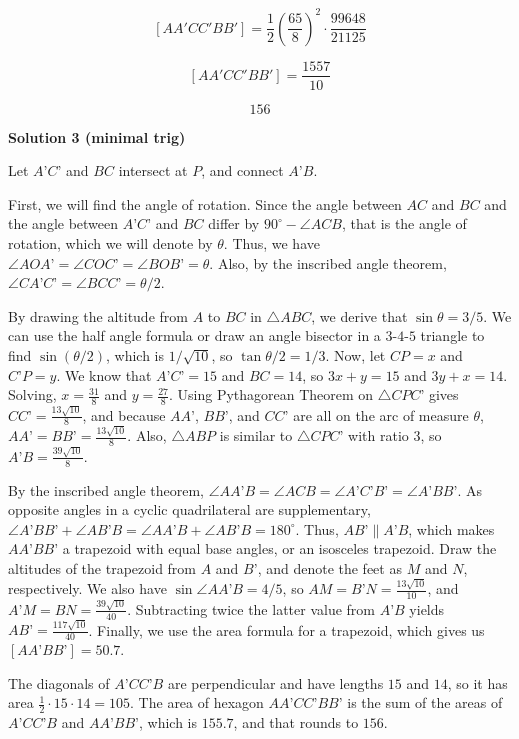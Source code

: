 \begin{enumerate}
 \[[AA'CC'BB'] =\frac12\left(\frac{65}{8}\right)^2\cdot\frac{99648}{21125}\]

 \[[AA'CC'BB']=\frac{1557}{10}\]

 \[\boxed{156}\]




\textbf{Solution 3 (minimal trig)}

Let $A’C’$ and $BC$ intersect at $P$, and connect $A’B$. 

 First, we will find the angle of rotation. Since the angle between $AC$ and $BC$ and the angle between $A’C’$ and $BC$ differ by $90^{\circ}-\angle ACB$, that is the angle of rotation, which we will denote by $\theta$. Thus, we have $\angle AOA’ = \angle COC’ = \angle BOB’ = \theta$. Also, by the inscribed angle theorem, $\angle CA’C’=\angle BCC’=\theta/2$. 

 By drawing the altitude from $A$ to $BC$ in $\triangle ABC$, we derive that $\sin{\theta}=3/5$. We can use the half angle formula or draw an angle bisector in a $3$-$4$-$5$ triangle to find $\sin({\theta/2})$, which is $1/\sqrt{10}$, so $\tan{\theta/2}=1/3$. Now, let $CP=x$ and $C’P=y$. We know that $A’C’=15$ and $BC=14$, so $3x+y=15$ and $3y+x=14$. Solving, $x=\frac{31}{8}$ and $y=\frac{27}{8}$. Using Pythagorean Theorem on $\triangle CPC’$ gives $CC’=\frac{13\sqrt{10}}{8}$, and because $AA’$, $BB’$, and $CC’$ are all on the arc of measure $\theta$, $AA’=BB’=\frac{13\sqrt{10}}{8}$. Also, $\triangle ABP$ is similar to $\triangle CPC’$ with ratio $3$, so $A’B= \frac{39\sqrt{10}}{8}$.

 
By the inscribed angle theorem, $\angle AA’B=\angle ACB=\angle A’C’B’=\angle A’BB’$. As opposite angles in a cyclic quadrilateral are supplementary, $\angle A’BB’+\angle AB’B=\angle AA’B+\angle AB’B=180^{\circ}$. Thus, $AB’ \parallel A’B$, which makes $AA’BB’$ a trapezoid with equal base angles, or an isosceles trapezoid. Draw the altitudes of the trapezoid from $A$ and $B’$, and denote the feet as $M$ and $N$, respectively. We also have $\sin {\angle AA’B}=4/5$, so $AM=B’N= \frac{13\sqrt{10}}{10}$, and $A’M=BN= \frac{39\sqrt{10}}{40}$. Subtracting twice the latter value from $A’B$ yields $AB’= \frac{117\sqrt{10}}{40}$. Finally, we use the area formula for a trapezoid, which gives us $[AA’BB’]=50.7$.

 
The diagonals of $A’CC’B$ are perpendicular and have lengths $15$ and $14$, so it has area $\frac{1}{2}\cdot{15}\cdot{14}=105$. The area of hexagon $AA’CC’BB’$ is the sum of the areas of $A’CC’B$ and $AA’BB’$, which is $155.7$, and that rounds to $\boxed{156}$.


\end{enumerate}

